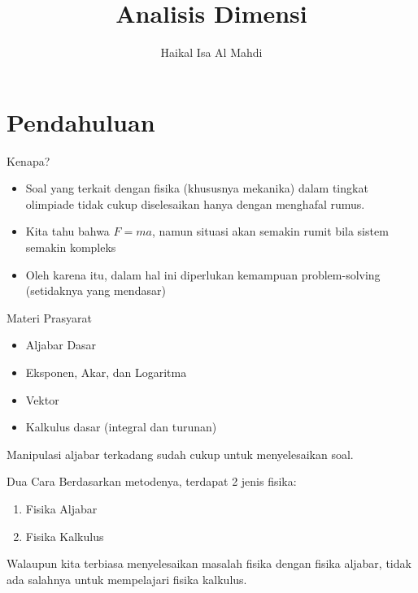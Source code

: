 \documentclass[handout,11pt]{beamer}
\author{Haikal Isa Al Mahdi}
\title{Analisis Dimensi}
\begin{document}
\begin{frame}
\titlepage
\end{frame}

\begin{frame}
\tableofcontents
\end{frame}


\section{Pendahuluan}
\label{sec:Pendahuluan}

\begin{frame}{Kenapa?}

\begin{itemize}
\item Soal yang terkait dengan fisika (khususnya mekanika) dalam tingkat olimpiade tidak cukup diselesaikan hanya dengan menghafal rumus.
\item Kita tahu bahwa $F=ma$, namun situasi akan semakin rumit bila sistem semakin kompleks
\item Oleh karena itu, dalam hal ini diperlukan kemampuan problem-solving (setidaknya yang mendasar)
\end{itemize}
\end{frame}

\begin{frame}{Materi Prasyarat}
\begin{itemize}
\item Aljabar Dasar
\item Eksponen, Akar, dan Logaritma
\item Vektor
\item Kalkulus dasar (integral dan turunan)

\end{itemize}

Manipulasi aljabar terkadang sudah cukup untuk menyelesaikan soal.
\end{frame}


\begin{frame}{Dua Cara}
Berdasarkan metodenya, terdapat 2 jenis fisika:
\begin{enumerate}
  \item Fisika Aljabar
  \item Fisika Kalkulus
\end{enumerate}
Walaupun kita terbiasa menyelesaikan masalah fisika dengan fisika aljabar, tidak ada salahnya untuk mempelajari fisika kalkulus.

\end{frame}
\end{document}

